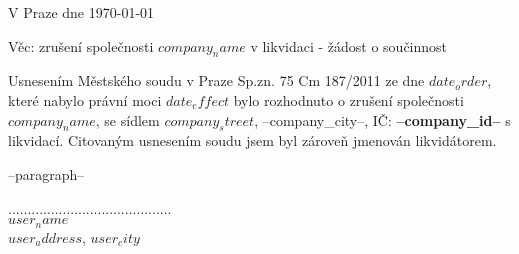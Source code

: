 \documentclass{../static/myletter}
\begin{document}
\begin{letter}{}
\opening{V Praze dne \today}
    Věc: zrušení společnosti \textbf{$company_name$} v likvidaci - žádost o součinnost                  

Usnesením Městského soudu v Praze Sp.zn. 75 Cm 187/2011 ze dne $date_order$, které nabylo právní moci $date_effect$ bylo rozhodnuto o zrušení společnosti $company_name$, se sídlem $company_street$, --company_city--,  IČ: \textbf{--company_id--} s likvidací. Citovaným usnesením soudu jsem byl zároveň jmenován likvidátorem.  

--paragraph--

\hspace*{5cm}

\closing{..........................................\\ $user_name$ \\ $user_address$, $user_city$}
\end{letter}
\end{document}
